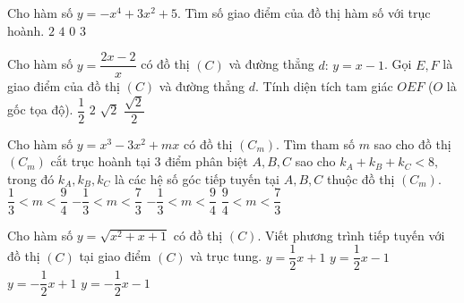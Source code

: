 \begin{ex}%
Cho hàm số $y=-x^4+3x^2+5$. Tìm số giao điểm của đồ thị hàm số với trục 
hoành.
\choice
{\True $2$}
{$4$}
{$0$}
{$3$}
\end{ex}

\begin{ex}%
Cho hàm số $y=\dfrac{2x-2}{x}$ có đồ thị 
$(C)$  và đường thẳng $d{:} \, y = x-1$. Gọi $E, F$ là giao điểm của đồ thị   $(C)$  và đường thẳng $d$. Tính diện tích tam giác $OEF$ ($O$ là gốc tọa độ).
\choice
{\True $\dfrac{1}{2}$}
{$2$}
{$\sqrt{2}$}
{$\dfrac{\sqrt{2}}{2}$}
\end{ex}


\begin{ex}%
 Cho hàm số $y=x^3-3x^2+mx$ có đồ thị $(C_m)$. Tìm tham số $m$  sao cho đồ thị $(C_m)$  cắt trục hoành tại $3$ điểm phân biệt $A,B,C$ sao cho $k_A+k_B+k_C < 8{,}$ trong đó $k_A,k_B,k_C$ là các hệ số góc tiếp tuyến tại $A,B,C$ thuộc đồ thị $(C_m).$
\choice
{\True $\dfrac{1}{3} < m < \dfrac{9}{4}$}
{ $- \dfrac{1}{3} < m < \dfrac{7}{3}$}
{ $-\dfrac{1}{3} < m < \dfrac{9}{4}$}
{ $\dfrac{9}{4} < m < \dfrac{7}{3}$}
\end{ex}



\begin{ex}%
Cho hàm số $y=\sqrt{x^2+x+1}$ có đồ thị $(C)$. Viết phương trình tiếp tuyến với 
đồ thị  $(C)$  tại giao điểm $(C)$ 
 và trục tung.
\choice
{\True $y=\dfrac{1}{2}x+1$}
{ $y=\dfrac{1}{2}x-1$}
{ $y=-\dfrac{1}{2}x+1$}
{ $y=-\dfrac{1}{2}x-1$}
\end{ex}

